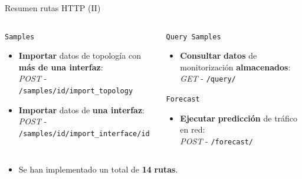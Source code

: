 \documentclass[aspectratio=169,xcolor=dvipsnames]{beamer}
\begin{document}
	\begin{frame}{Resumen rutas HTTP (II)}
		\begin{columns}
			\begin{column}{0.5\textwidth}
				\begin{exampleblock}{\texttt{Samples}}
					\begin{itemize}
						\item \textbf{Importar} datos de topología con \textbf{más de una interfaz}: \\ \textit{\small POST} - \texttt{\small /samples/id/import\_topology}
						
						\item \textbf{Importar} datos de \textbf{una interfaz}: \\ \textit{POST} - \texttt{\small /samples/id/import\_interface/id}
					\end{itemize}
				\end{exampleblock}
			\end{column}
		
			\begin{column}{0.5\textwidth}
				\begin{exampleblock}{\texttt{Query Samples}}
					\begin{itemize}
						\item \textbf{Consultar} \textbf{datos} de monitorización \textbf{almacenados}: \\ \textit{GET} - \texttt{\small /query/}
					\end{itemize}
				\end{exampleblock}
			
				\begin{exampleblock}{\texttt{Forecast}}
					\begin{itemize}
						\item \textbf{Ejecutar} \textbf{predicción} de tráfico en red: \\ \textit{POST} - \texttt{\small /forecast/}
					\end{itemize}
				\end{exampleblock}
			\end{column}
		\end{columns}
	
		\vspace{22px}
	
		\begin{itemize}
			\item Se han implementado un total de \textbf{14} \textbf{rutas}.
		\end{itemize}
	\end{frame}
	
\end{document}
